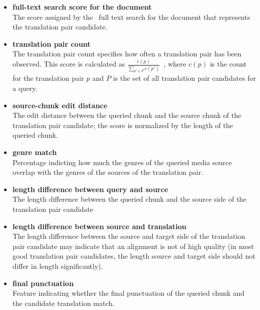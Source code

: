 \begin{itemize}
	
	\item \textbf{full-text search score for the document}\\
	The score assigned by the \postgres~full text search for the document that represents the translation pair candidate.
    
	\item \textbf{translation pair count}\\
	The translation pair count specifies how often a translation pair has been observed. This score is calculated as $\frac{c(p)}{ \sum_{p' \in P}{c(p')}  } $\ , where $c(p)$ is the count for the translation pair $p$ and $P$ is the set of all translation pair candidates for a query.
	
	\item \textbf{source-chunk edit distance}\\
	The edit distance between the queried chunk and the source chunk of the translation pair candidate; the score is normalized by the length of the queried chunk.
	
	\item \textbf{genre match}\\
	Percentage indicting how much the genres of the queried media source overlap with the genres of the sources of the translation pair.

	\item \textbf{length difference between query and source}\\
	The length difference between the queried chunk and the source side of the translation pair candidate 


	\item \textbf{length difference between source and translation}\\
	The length difference between the source and target side of the translation pair candidate may indicate that an alignment is not of high quality (in most good translation pair candidates,  the length source and target side should not differ in length significantly).
	
	\item \textbf{final punctuation}\\
	Feature indicating whether the final punctuation of the queried chunk and the candidate translation match.

\end{itemize}



